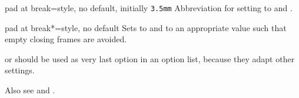 \begin{docTcbKey}{pad at break}{=}{style, no default, initially \texttt{3.5mm}}
  Abbreviation for setting  to 
  and .
\end{docTcbKey}

\enlargethispage*{10mm}

\begin{docTcbKey}{pad at break*}{=}{style, no default}
  Sets  to  and
   to an appropriate value such that
  empty closing frames are avoided.
\end{docTcbKey}

\begin{dispListing}

\begin{tcolorbox}[enhanced jigsaw,breakable,pad at break*=0mm,
  title={For this box, the pad space at the break point is set to 0mm}]
  \lipsum[1-2]
\end{tcolorbox}
\end{dispListing}
{\tcbusetemp}


\begin{marker}
 or 
should be used as very last option in an option list, because
they adapt other settings.
\end{marker}


\begin{marker}
Also see 
and .
\end{marker}


